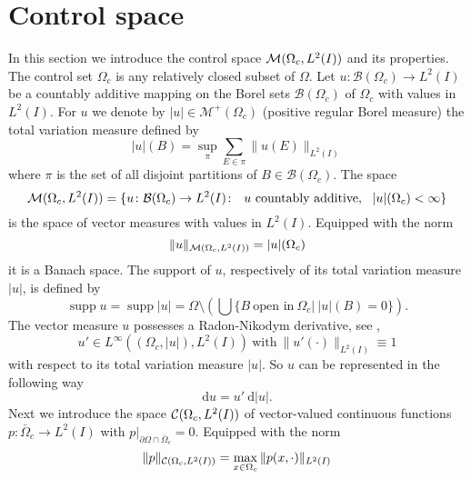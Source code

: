 \section{Control space}\label{control space}
In this section we introduce the control space $\mathcal{M}(\Omega_c, L^{2}(I))$ and its properties. The control set $\Omega_c$ is any relatively closed subset of $\Omega$. Let $u\colon\mathcal B(\Omega_c)\rightarrow L^2(I)$ be a countably additive mapping on the Borel sets $\mathcal B(\Omega_c)$ of $\Omega_c$ with values in $L^2(I)$. For $u$ we denote by $|u|\in \mathcal M^+(\Omega_c)$ (positive regular Borel measure) the total variation measure defined by
\begin{equation*}
|u|(B) = \underset{\pi}{\operatorname{sup}}\sum_{E\in\pi}\|u(E)\|_{L^2(I)}
\end{equation*}
where $\pi$ is the set of all disjoint partitions of $B\in \mathcal B(\Omega_c)$. The space
\begin{equation*}
\mathcal{M}(\Omega_c, L^{2}(I))=\{u\colon \mathcal B(\Omega_c)\rightarrow L^2(I)\colon~~u~\text{countably additive},~~|u|(\Omega_c)<\infty\}
\end{equation*}
is the space of vector measures with values in $L^2(I)$. Equipped with the norm
\begin{equation*}
\|u\|_{\mathcal{M}(\Omega_c, L^{2}(I))}=|u|(\Omega_c)
\end{equation*}
it is a Banach space. The support of $u$, respectively of its
 total variation measure $|u|$, is defined by
\begin{equation*}
\operatorname{supp}u = \operatorname{supp}|u|=\Omega\setminus\left(\bigcup\{B~\text{open in}~\Omega_c|~|u|(B)=0\}\right).
\end{equation*}
The vector measure $u$ possesses a Radon-Nikodym derivative, see \cite{Lang1983realanalysis},
\begin{equation}\label{eq:radon_nikodym}
u'\in L^{\infty}((\Omega_c,|u|),L^2(I))~\text{with}~\|u'(\cdot)\|_{L^2(I)}\equiv 1
\end{equation}
with respect to its total variation measure $|u|$. So $u$ can be represented in the following way
\begin{equation*}
\mathrm du=u'~\mathrm d|u|.
\end{equation*}
Next we introduce the space $\mathcal{C}(\Omega_c, L^{2}(I))$ of vector-valued continuous functions $p\colon\bar \Omega_c\rightarrow L^2(I)$ with $p|_{\partial\Omega\cap \bar \Omega_c}=0$. Equipped with the norm
\begin{equation*}
\|p\|_{\mathcal{C}(\Omega_c, L^{2}(I))}=\max_{x\in\Omega_c}\|p(x,\cdot)\|_{L^2(I)}
\end{equation*}
